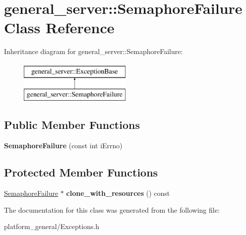 \hypertarget{classgeneral__server_1_1SemaphoreFailure}{\section{general\-\_\-server\-:\-:\-Semaphore\-Failure \-Class \-Reference}
\label{classgeneral__server_1_1SemaphoreFailure}
}
\-Inheritance diagram for general\-\_\-server\-:\-:\-Semaphore\-Failure\-:\begin{figure}[H]
\begin{center}
\leavevmode
\includegraphics[height=2.000000cm]{classgeneral__server_1_1SemaphoreFailure}
\end{center}
\end{figure}
\subsection*{\-Public \-Member \-Functions}
\begin{DoxyCompactItemize}
\item 
\hypertarget{classgeneral__server_1_1SemaphoreFailure_a6ec07ad73f450846759fce9adbef20ef}{{\bfseries \-Semaphore\-Failure} (const int i\-Errno)}\label{classgeneral__server_1_1SemaphoreFailure_a6ec07ad73f450846759fce9adbef20ef}

\end{DoxyCompactItemize}
\subsection*{\-Protected \-Member \-Functions}
\begin{DoxyCompactItemize}
\item 
\hypertarget{classgeneral__server_1_1SemaphoreFailure_afe6986efe55747c96999b7c35f5d0c2d}{\hyperlink{classgeneral__server_1_1SemaphoreFailure}{\-Semaphore\-Failure} $\ast$ {\bfseries clone\-\_\-with\-\_\-resources} () const }\label{classgeneral__server_1_1SemaphoreFailure_afe6986efe55747c96999b7c35f5d0c2d}

\end{DoxyCompactItemize}


\-The documentation for this class was generated from the following file\-:\begin{DoxyCompactItemize}
\item 
platform\-\_\-general/\-Exceptions.\-h\end{DoxyCompactItemize}

